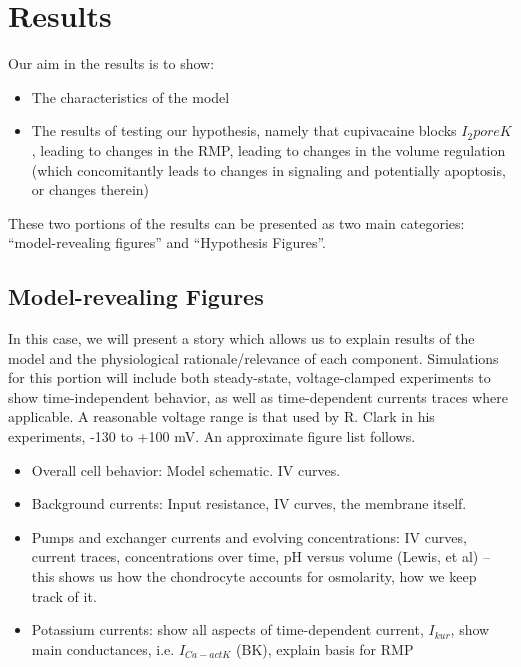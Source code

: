 \section{Results}
\label{results}


Our aim in the results is to show:
\begin{itemize}
\item The characteristics of the model
\item The results of testing our hypothesis, namely that cupivacaine
  blocks $I_2poreK$, leading to changes in the RMP, leading to changes
  in the volume regulation (which concomitantly leads to changes in
  signaling and potentially apoptosis, or changes therein)
\end{itemize}

These two portions of the results can be presented as two main
categories: ``model-revealing figures'' and ``Hypothesis Figures''.

\subsection{Model-revealing Figures}
In this case, we will present a story which allows us to explain
results of the model and the physiological rationale/relevance of each
component. Simulations for this portion will include both
steady-state, voltage-clamped experiments to show time-independent
behavior, as well as time-dependent currents traces where
applicable. A reasonable voltage range is that used by R. Clark in his
experiments, -130 to +100 mV. An approximate figure list follows.

\begin{itemize}
\item Overall cell behavior: Model schematic. IV curves.
\item Background currents: Input resistance, IV curves, the membrane itself.
\item Pumps and exchanger currents and evolving concentrations: IV
  curves, current traces, concentrations over time, pH versus volume
  (Lewis, et al) -- this shows us how the chondrocyte accounts for
  osmolarity, how we keep track of it.
\item Potassium currents: show all aspects of time-dependent current,
  $I_{kur}$, show main conductances, i.e. $I_{Ca-act K}$ (BK), explain
  basis for RMP
\end{itemize}

